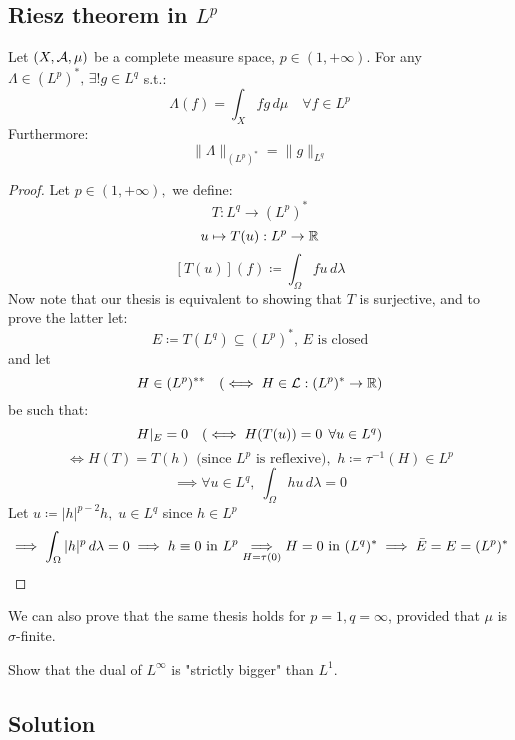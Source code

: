 \subsection{Riesz theorem in \texorpdfstring{$L^p$}{Lp}}
Let $(X,\mathcal{A},\mu) $ be a complete measure space, $p\in (1,+\infty)$. For any $\Lambda \in (L^p)^*,\,\exists! g \in L^q $ s.t.:
\[
\Lambda(f)  = \int_X fg\,d\mu \quad \forall f \in L^p
\]
Furthermore: 
\[
\|\Lambda \|_{(L^p)^*} = \|g\|_{L^q}
\]
\begin{proof}
Let $p \in (1,+\infty),$ we define: \[
T: L^q \to (L^p)^*\]
\[ u\mapsto T(u): L^p \to \mathbb{R} \]
\[ [T(u)](f) \coloneqq \displaystyle\int_{\Omega} fu\,d\lambda\]
Now note that our thesis is equivalent to showing that $T$ is surjective, and to prove the latter let:\[
E\coloneqq T(L^q)\subseteq (L^p)^*, \,E\text{ is closed}
\]
and let
\[
H \in (L^p)^{**} \quad(\iff H\in \mathcal{L} : (L^p)^* \to \mathbb{R})
\]
be such that:   
\[
H\arrowvert_E = 0 \quad (\iff H(T(u))=0 \;\,\forall u \in L^q)
\]
\[
\iff H(T) = T(h) \text{ (since $L^p$ is reflexive)}, \,\,h\coloneqq \tau^{-1} (H) \in L^p
\]
\[
\implies \forall u \in L^q,\; \int_\Omega hu\,d\lambda = 0
\]
Let $u \coloneqq |h|^{p-2}h,\;u\in L^q$ since $h \in L^p$
\[
\implies \int_\Omega |h|^p \,d\lambda = 0 \implies h\equiv 0 \text{ in } L^p \underset{H=\tau(0)}{\Longrightarrow} H=0 \text{ in } (L^q)^* \implies \Bar{E} = E = (L^p)^*
\]


\end{proof}
We can also prove that the same thesis holds for $p=1, q=\infty$, provided that $\mu$ is $\sigma$-finite.


\question
Show that the dual of $L^\infty$ is "strictly bigger" than $L^1$.

\subsection*{Solution}

